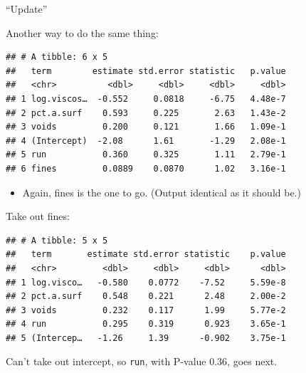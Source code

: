 \documentclass[
  ignorenonframetext,
]{beamer}
\newenvironment{Shaded}{\begin{snugshade}}{\end{snugshade}}
\newcommand{\FloatTok}[1]{\textcolor[rgb]{0.00,0.00,0.81}{#1}}
\newcommand{\KeywordTok}[1]{\textcolor[rgb]{0.13,0.29,0.53}{\textbf{#1}}}
\newcommand{\NormalTok}[1]{#1}
\newcommand{\OperatorTok}[1]{\textcolor[rgb]{0.81,0.36,0.00}{\textbf{#1}}}
\newcommand{\StringTok}[1]{\textcolor[rgb]{0.31,0.60,0.02}{#1}}
\providecommand{\tightlist}{%
  \setlength{\itemsep}{0pt}\setlength{\parskip}{0pt}}
\begin{document}
\begin{frame}[fragile]{``Update''}
\protect\hypertarget{update}{}

Another way to do the same thing:

\begin{Shaded}
\end{Shaded}

\begin{verbatim}
## # A tibble: 6 x 5
##   term        estimate std.error statistic   p.value
##   <chr>          <dbl>     <dbl>     <dbl>     <dbl>
## 1 log.viscos…  -0.552     0.0818     -6.75   4.48e-7
## 2 pct.a.surf    0.593     0.225       2.63   1.43e-2
## 3 voids         0.200     0.121       1.66   1.09e-1
## 4 (Intercept)  -2.08      1.61       -1.29   2.08e-1
## 5 run           0.360     0.325       1.11   2.79e-1
## 6 fines         0.0889    0.0870      1.02   3.16e-1
\end{verbatim}

\begin{itemize}
\tightlist
\item
  Again, fines is the one to go. (Output identical as it should be.)
\end{itemize}

\end{frame}

\begin{frame}[fragile]{Take out fines:}
\protect\hypertarget{take-out-fines}{}

\begin{Shaded}
\end{Shaded}

\begin{verbatim}
## # A tibble: 5 x 5
##   term       estimate std.error statistic    p.value
##   <chr>         <dbl>     <dbl>     <dbl>      <dbl>
## 1 log.visco…   -0.580    0.0772    -7.52     5.59e-8
## 2 pct.a.surf    0.548    0.221      2.48     2.00e-2
## 3 voids         0.232    0.117      1.99     5.77e-2
## 4 run           0.295    0.319      0.923    3.65e-1
## 5 (Intercep…   -1.26     1.39      -0.902    3.75e-1
\end{verbatim}

Can't take out intercept, so \texttt{run}, with P-value 0.36, goes next.

\end{frame}
\end{document}
